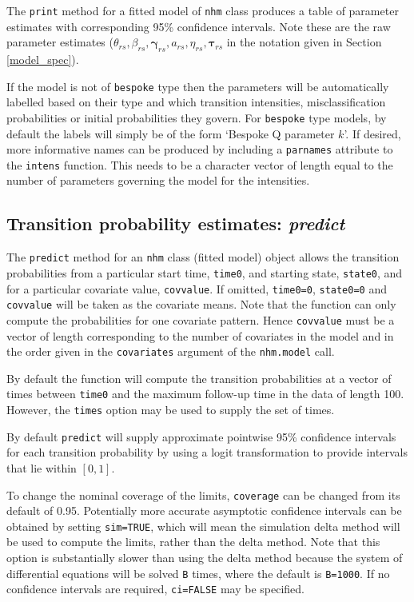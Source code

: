 \documentclass{article}
\numberwithin{equation}{section}
\begin{document}
The \verb!print! method for a fitted model of \verb!nhm! class produces a table of parameter estimates with corresponding 95\% confidence intervals. Note these are the raw parameter estimates ($\theta_{rs}, \beta_{rs}, \bm\gamma_{rs}, a_{rs}, \eta_{rs}, \bm\tau_{rs}$ in the notation given in Section \ref{model_spec}). 

If the model is not of \verb!bespoke! type then the parameters will be automatically labelled based on their type and which transition intensities, misclassification probabilities or initial probabilities they govern. For \verb!bespoke! type models, by default the labels will simply be of the form `Bespoke Q parameter $k$'. If desired, more informative names can be produced by including a \verb!parnames! attribute to the \verb!intens! function. This needs to be a character vector of length equal to the number of parameters governing the model for the intensities. 

\subsection{Transition probability estimates: {\it predict}}

The \verb!predict! method for an \verb!nhm! class (fitted model) object allows the transition probabilities from a particular start time, \verb!time0!, and starting state, \verb!state0!, and for a particular covariate value, \verb!covvalue!. 
If omitted, \verb!time0=0!, \verb!state0=0! and \verb!covvalue! will be taken as the covariate means.
Note that the function can only compute the probabilities for one covariate pattern. Hence \verb!covvalue! must be a vector of  length corresponding to the number of covariates in the model and in the order given in the \verb!covariates! argument of the \verb!nhm.model! call.

By default the function will compute the transition probabilities at a vector of times between \verb!time0! and the maximum follow-up time in the data of length 100. However, the \verb!times! option may be used to supply the set of times.

By default \verb!predict! will supply approximate pointwise 95\% confidence intervals for each transition probability by using a logit transformation to provide intervals that lie within $[0,1]$. 

To change the nominal coverage of the limits, \verb!coverage! can be changed from its default of 0.95. Potentially more accurate asymptotic confidence intervals can be obtained by setting \verb!sim=TRUE!, which will mean the simulation delta method \cite{mandel} will be used to compute the limits, rather than the delta method. Note that this option is substantially slower than using the delta method because the system of differential equations will be solved \verb!B! times, where the default is \verb!B=1000!. If no confidence intervals are required, \verb!ci=FALSE! may be specified.
\end{document}
